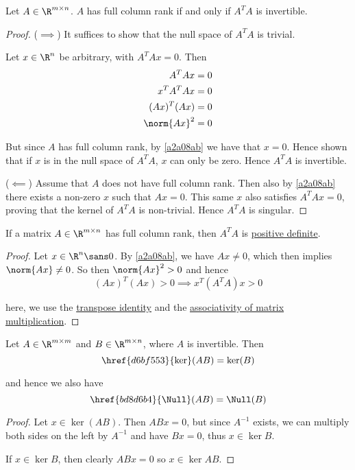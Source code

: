 \label{d4f72eb}

Let $A\in\R^{m\times n}$. $A$ has full column rank if and only if $A^TA$ is
invertible.

\begin{proof}
  ($\implies$) It suffices to show that the null space of $A^TA$ is trivial.

  Let $x\in\R^n$ be arbitrary, with $A^TAx=0$. Then
  \begin{align*}
    A^TAx       &=0 \\
    x^TA^TAx    &=0 \\
    (Ax)^T(Ax)  &=0 \\
    \norm{Ax}^2 &=0
  \end{align*}

  But since $A$ has full column rank, by \autoref{a2a08ab} we have that $x=0$.
  Hence shown that if $x$ is in the null space of $A^TA$, $x$ can only be zero.
  Hence $A^TA$ is invertible.

  ($\impliedby$) Assume that $A$ does not have full column rank. Then also by
  \autoref{a2a08ab} there exists a non-zero $x$ such that $Ax=0$. This same $x$
  also satisfies $A^TAx=0$, proving that the kernel of $A^TA$ is non-trivial.
  Hence $A^TA$ is singular.
\end{proof}

\label{fd1f53e}

If a matrix $A\in\R^{m\times n}$ has full column rank, then $A^TA$ is
\href{e25e722}{positive definite}.

\begin{proof}
  Let $x\in\R^n\sans0$. By \autoref{a2a08ab}, we have $Ax\neq0$, which then
  implies $\norm{Ax}\neq0$. So then $\norm{Ax}^2>0$ and hence
  $$
    (Ax)^T(Ax)>0\implies x^T(A^TA)x>0
  $$

  here, we use the \href{e8b98fd}{transpose identity} and the
  \href{a7d4369}{associativity of matrix multiplication}.
\end{proof}

\label{f7bb4dd}

Let $A\in\R^{m\times m}$ and $B\in\R^{m\times n}$, where $A$ is invertible.
Then
$$
  \href{d6bf553}{\ker}(AB)=\ker(B)
$$

and hence we also have
$$
  \href{bd8d6b4}{\Null}(AB)=\Null(B)
$$

\begin{proof}
  Let $x\in\ker(AB)$. Then $ABx=0$, but since $A^{-1}$ exists, we can multiply
  both sides on the left by $A^{-1}$ and have $Bx=0$, thus $x\in\ker B$.

  If $x\in\ker B$, then clearly $ABx=0$ so $x\in\ker AB$.
\end{proof}
